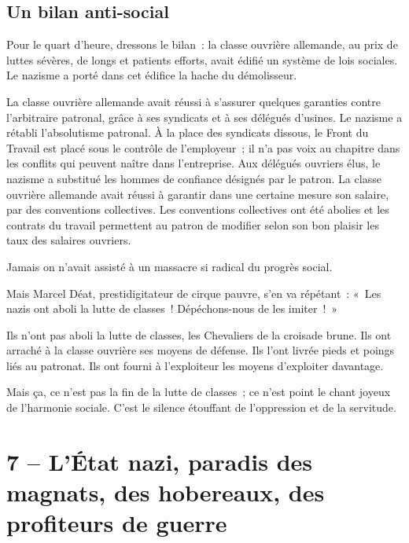 \documentclass[french,twoside]{book} %
\newcommand\chapteropen{} %
\newcommand\chapterclose{} %
\begin{document}
\section[Un bilan anti-social]{Un bilan anti-social}
\noindent Pour le quart d’heure, dressons le bilan : la classe ouvrière allemande, au prix de luttes sévères, de longs et patients efforts, avait édifié un système de lois sociales. Le nazisme a porté dans cet édifice la hache du démolisseur.\par
La classe ouvrière allemande avait réussi à s’assurer quelques garanties contre l’arbitraire patronal, grâce à ses syndicats et à ses délégués d’usines. Le nazisme a rétabli l’absolutisme patronal. À la place des syndicats dissous, le Front du Travail est placé sous le contrôle de l’employeur ; il n’a pas voix au chapitre dans les conflits qui peuvent naître dans l’entreprise. Aux délégués ouvriers élus, le nazisme a substitué les hommes de confiance désignés par le patron. La classe ouvrière allemande avait réussi à garantir dans une certaine mesure son salaire, par des conventions collectives. Les conventions collectives ont été abolies et les contrats du travail permettent au patron de modifier selon son bon plaisir les taux des salaires ouvriers.\par
Jamais on n’avait assisté à un massacre si radical du progrès social.\par
Mais Marcel Déat, prestidigitateur de cirque pauvre, s’en va répétant : « Les nazis ont aboli la lutte de classes ! Dépéchons-nous de les imiter ! »\par
Ils n’ont pas aboli la lutte de classes, les Chevaliers de la croisade brune. Ils ont arraché à la classe ouvrière ses moyens de défense. Ils l’ont livrée pieds et poings liés au patronat. Ils ont fourni à l’exploiteur les moyens d’exploiter davantage.\par
Mais ça, ce n’est pas la fin de la lutte de classes ; ce n’est point le chant joyeux de l’harmonie sociale. C’est le silence étouffant de l’oppression et de la servitude.
\chapterclose


\chapteropen
\chapter[7 – L’État nazi, paradis des magnats, des hobereaux, des profiteurs de guerre]{7 – L’État nazi, paradis des magnats, des hobereaux, des profiteurs de guerre}\renewcommand{\leftmark}{7 – L’État nazi, paradis des magnats, des hobereaux, des profiteurs de guerre}
\end{document}
